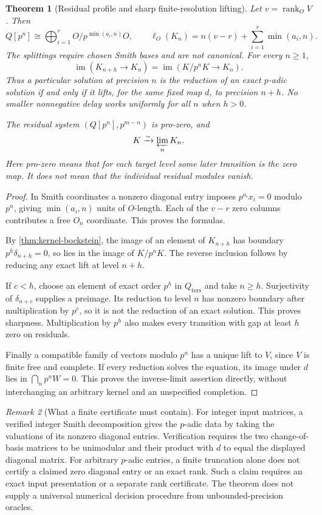 \documentclass[11pt]{article}
\newtheorem{theorem}{Theorem}[section]
\theoremstyle{definition}
\theoremstyle{remark}
\newtheorem{remark}[theorem]{Remark}
\begin{document}
\begin{theorem}[Residual profile and sharp finite-resolution lifting]\label{thm:precision-window}
Let $v=\operatorname{rank}_O V$. Then
\[
 Q[p^n]\cong\bigoplus_{i=1}^r O/p^{\min(a_i,n)}O,
 \qquad
 \ell_O(K_n)=n(v-r)+\sum_{i=1}^r\min(a_i,n).
\]
The splittings require chosen Smith bases and are not canonical. For every $n\geq1$,
\[
 \boxed{\operatorname{im}(K_{n+h}\longrightarrow K_n)
       =\operatorname{im}(K/p^nK\longrightarrow K_n).}
\]
Thus a particular solution at precision $n$ is the reduction of an exact $p$-adic solution if and only if it lifts, for the same fixed map $d$, to precision $n+h$. No smaller nonnegative delay works uniformly for all $n$ when $h>0$.

The residual system $(Q[p^n],p^{m-n})$ is pro-zero, and
\[
 K\xrightarrow{\sim}\varprojlim_n K_n.
\]
Here pro-zero means that for each target level some later transition is the zero map. It does not mean that the individual residual modules vanish.
\end{theorem}
\begin{proof}
In Smith coordinates a nonzero diagonal entry imposes $p^{a_i}x_i=0$ modulo $p^n$, giving $\min(a_i,n)$ units of $O$-length. Each of the $v-r$ zero columns contributes a free $O_n$ coordinate. This proves the formulas.

By \cref{thm:kernel-bockstein}, the image of an element of $K_{n+h}$ has boundary $p^h\delta_{n+h}=0$, so lies in the image of $K/p^nK$. The reverse inclusion follows by reducing any exact lift at level $n+h$.

If $c<h$, choose an element of exact order $p^h$ in $Q_{\mathrm{tors}}$ and take $n\geq h$. Surjectivity of $\delta_{n+c}$ supplies a preimage. Its reduction to level $n$ has nonzero boundary after multiplication by $p^c$, so it is not the reduction of an exact solution. This proves sharpness. Multiplication by $p^h$ also makes every transition with gap at least $h$ zero on residuals.

Finally a compatible family of vectors modulo $p^n$ has a unique lift to $V$, since $V$ is finite free and complete. If every reduction solves the equation, its image under $d$ lies in $\bigcap_n p^nW=0$. This proves the inverse-limit assertion directly, without interchanging an arbitrary kernel and an unspecified completion.
\end{proof}

\begin{remark}[What a finite certificate must contain]
For integer input matrices, a verified integer Smith decomposition gives the $p$-adic data by taking the valuations of its nonzero diagonal entries. Verification requires the two change-of-basis matrices to be unimodular and their product with $d$ to equal the displayed diagonal matrix. For arbitrary $p$-adic entries, a finite truncation alone does not certify a claimed zero diagonal entry or an exact rank. Such a claim requires an exact input presentation or a separate rank certificate. The theorem does not supply a universal numerical decision procedure from unbounded-precision oracles.
\end{remark}
\end{document}
